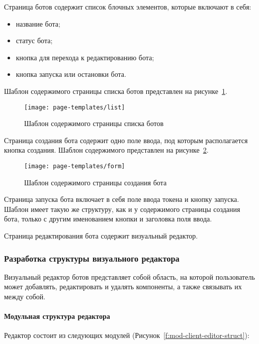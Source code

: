 Страница ботов содержит список блочных элементов, которые
включают в себя:
\begin{itemize}
	\item название бота;
	\item статус бота;
	\item кнопка для перехода к редактированию бота;
	\item кнопка запуска или остановки бота.
\end{itemize}

Шаблон содержимого страницы списка ботов представлен на
рисунке~\ref{f:list-template}.

\begin{figure}[!ht]
	\centering
	\texttt{[image: page-templates/list]}
	\caption{Шаблон содержимого страницы списка ботов}
	\label{f:list-template}
\end{figure}

Страница создания бота содержит одно поле ввода, под которым
располагается кнопка создания. Шаблон содержимого представлен на
рисунке~\ref{f:form-template}.


\begin{figure}[!ht]
	\centering
	\texttt{[image: page-templates/form]}
	\caption{Шаблон содержимого страницы создания бота}
	\label{f:form-template}
\end{figure}

Страница запуска бота включает в себя поле ввода токена и кнопку
запуска. Шаблон имеет такую же структуру, как и у содержимого страницы создания бота,
только с другим именованием кнопки и заголовка поля ввода.

Страница редактирования бота содержит визуальный редактор.

\subsubsection{Разработка структуры визуального редактора}

Визуальный редактор ботов представляет собой область, на которой
пользователь может добавлять, редактировать и удалять компоненты, а также
связывать их между собой.

\paragraph{Модульная структура редактора}


Редактор состоит из следующих модулей (Рисунок~\ref{f:mod-client-editor-struct}):

